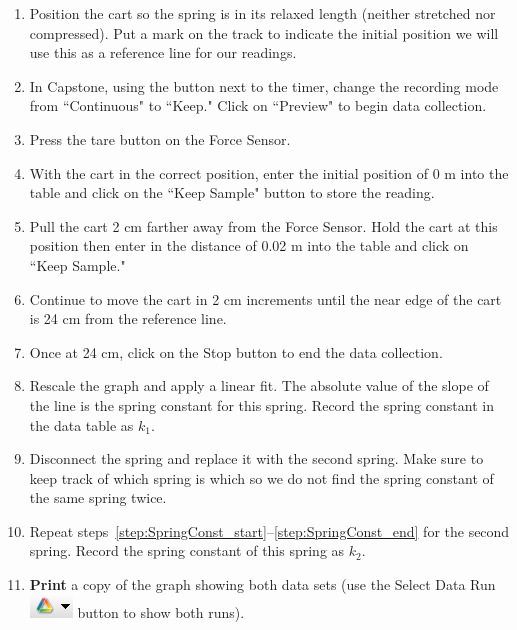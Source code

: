 \documentclass[main.tex]{subfiles}
\begin{document}
\begin{enumerate}
\item \label{step:SpringConst_start}
Position the cart so the spring is in its relaxed length (neither stretched nor compressed). Put a mark on the track to indicate the initial position we will use this as a reference line for our readings.
\item
In Capstone, using the button next to the timer, change the recording mode from ``Continuous" to ``Keep." Click on ``Preview" to begin data collection.
\item
Press the tare button on the Force Sensor.
\item
With the cart in the correct position, enter the initial position of 0 m into the table and click on the ``Keep Sample" button to store the reading.
\item
Pull the cart 2 cm farther away from the Force Sensor. Hold the cart at this position then enter in the distance of 0.02 m into the table and click on ``Keep Sample."
\item
Continue to move the cart in 2 cm increments until the near edge of the cart is 24 cm from the reference line.
\item
Once at 24 cm, click on the Stop button to end the data collection.
\item \label{step:SpringConst_end}
Rescale the graph and apply a linear fit. The absolute value of the slope of the line is the spring constant for this spring. Record the spring constant in the data table as $k_1.$
\item
Disconnect the spring and replace it with the second spring. Make sure to keep track of which spring is which so we do not find the spring constant of the same spring twice.
\item
Repeat steps~\ref{step:SpringConst_start}--\ref{step:SpringConst_end} for the second spring. Record the spring constant of this spring as $k_2.$
\item
\textbf{Print} a copy of the graph showing both data sets (use the Select Data Run \includegraphics{Select_Data_Run} button to show both runs).
\end{enumerate}
\end{document}
